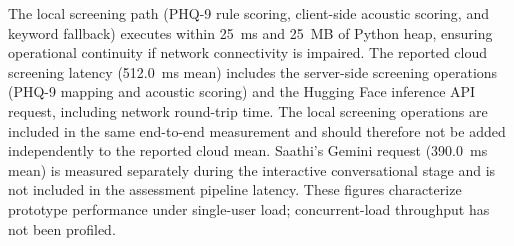 \documentclass[10pt, conference, letterpaper]{IEEEtran}
\begin{document}
\begin{table}[!t]
\caption{End-to-End Latency and Memory Profile}
\label{tab:latency}
\centering
{}
\end{table}

The local screening path (PHQ-9 rule scoring, client-side acoustic scoring, and
keyword fallback) executes within 25~ms and 25~MB of Python heap, ensuring
operational continuity if network connectivity is impaired.
The reported cloud screening latency (512.0~ms mean) includes the server-side
screening operations (PHQ-9 mapping and acoustic scoring) and the Hugging Face
inference API request, including network round-trip time.
The local screening operations are included in the same end-to-end measurement
and should therefore not be added independently to the reported cloud mean.
Saathi's Gemini request (390.0~ms mean) is measured separately during the interactive
conversational stage and is not included in the assessment pipeline latency.
These figures characterize prototype performance under single-user load;
concurrent-load throughput has not been profiled.
\end{document}
